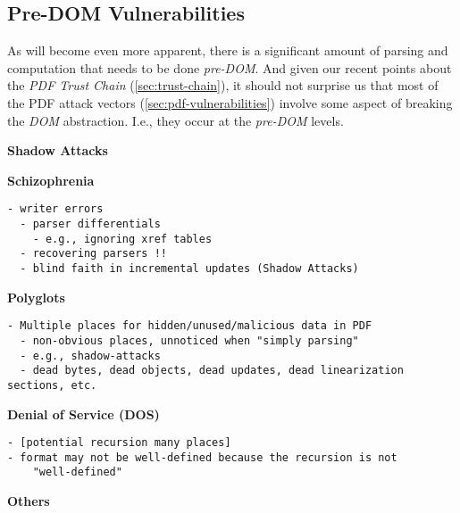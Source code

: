 \subsection{Pre-DOM Vulnerabilities }
\label{sec:predom-vulnerabilities}

As will become even more apparent, there is a significant amount of
parsing and computation that needs to be done \emph{pre-DOM}.
And given our recent points about the \emph{PDF Trust Chain}
(\cref{sec:trust-chain}),
it should not surprise us that most of the PDF attack vectors
(\cref{sec:pdf-vulnerabilities})
involve some aspect of breaking the \emph{DOM} abstraction.
I.e., they occur at the \emph{pre-DOM} levels.

{\bf{Shadow Attacks}} 

{\bf{Schizophrenia}} 
\begin{lstlisting}[style=meta]
  - writer errors
  - parser differentials
    - e.g., ignoring xref tables
  - recovering parsers !!
  - blind faith in incremental updates (Shadow Attacks)
\end{lstlisting}

{\bf{Polyglots}} 
\begin{lstlisting}[style=meta]
- Multiple places for hidden/unused/malicious data in PDF
  - non-obvious places, unnoticed when "simply parsing"
  - e.g., shadow-attacks
  - dead bytes, dead objects, dead updates, dead linearization sections, etc.
\end{lstlisting}

{\bf{Denial of Service (DOS)}} 
%
\begin{lstlisting}[style=meta]
- [potential recursion many places]
- format may not be well-defined because the recursion is not
    "well-defined"
\end{lstlisting}


{\bf{Others}} 
